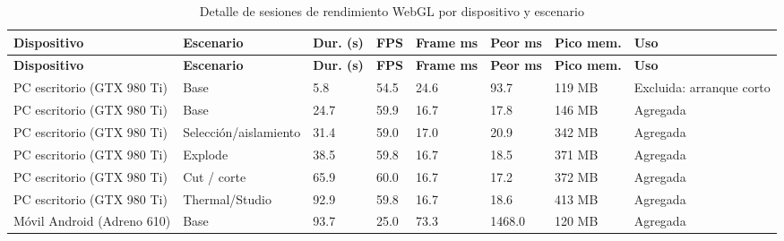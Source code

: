 \begin{table}[H]
\begin{tabular}{p{3.8cm}p{3.2cm}p{7.0cm}}
    \end{tabular}
    \par\vspace{0.5\baselineskip}
\end{table}

{
\scriptsize
\singlespacing
\renewcommand{\arraystretch}{1.08}
\setlength{\tabcolsep}{2pt}
\begin{longtable}{p{3.1cm}p{2.65cm}p{1.1cm}p{1.05cm}p{1.25cm}p{1.25cm}p{1.35cm}p{1.55cm}}
    \caption{Detalle de sesiones de rendimiento WebGL por dispositivo y escenario}
    \label{tab:rendimiento_webgl_detalle_sesiones}\\
    \hline
    \textbf{Dispositivo} & \textbf{Escenario} & \textbf{Dur. (s)} & \textbf{FPS} & \textbf{Frame ms} & \textbf{Peor ms} & \textbf{Pico mem.} & \textbf{Uso} \\ \hline
    \endfirsthead
    \hline
    \textbf{Dispositivo} & \textbf{Escenario} & \textbf{Dur. (s)} & \textbf{FPS} & \textbf{Frame ms} & \textbf{Peor ms} & \textbf{Pico mem.} & \textbf{Uso} \\ \hline
    \endhead
    PC escritorio (GTX 980 Ti) & Base & 5.8 & 54.5 & 24.6 & 93.7 & 119 MB & Excluida: arranque corto \\
    PC escritorio (GTX 980 Ti) & Base & 24.7 & 59.9 & 16.7 & 17.8 & 146 MB & Agregada \\
    PC escritorio (GTX 980 Ti) & Selección/aislamiento & 31.4 & 59.0 & 17.0 & 20.9 & 342 MB & Agregada \\
    PC escritorio (GTX 980 Ti) & Explode & 38.5 & 59.8 & 16.7 & 18.5 & 371 MB & Agregada \\
    PC escritorio (GTX 980 Ti) & Cut / corte & 65.9 & 60.0 & 16.7 & 17.2 & 372 MB & Agregada \\
    PC escritorio (GTX 980 Ti) & Thermal/Studio & 92.9 & 59.8 & 16.7 & 18.6 & 413 MB & Agregada \\
    Móvil Android (Adreno 610) & Base & 93.7 & 25.0 & 73.3 & 1468.0 & 120 MB & Agregada \\

\end{longtable}}
